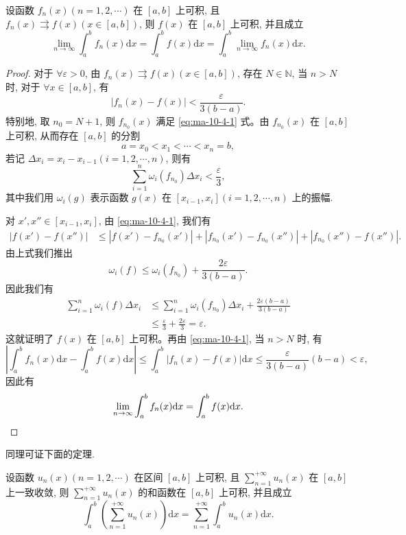 \begin{theorem}\label{theorem:ma-10-4-3}
设函数 $f_n(x)(n=1,2,\cdots)$ 在 $[a,b]$ 上可积, 且 $f_n(x)\rightrightarrows f(x)(x\in[a,b])$, 则 $f(x)$ 在 $[a,b]$ 上可积, 并且成立
\[
  \lim_{n\to\infty}\int_a^b f_n(x)\mathrm dx
  =\int_a^b f(x)\mathrm dx
  =\int_a^b\lim_{n\to\infty}f_n(x)\mathrm dx.
\]
\end{theorem}


\begin{proof}
对于 $\forall\varepsilon>0$, 由 $f_n(x)\rightrightarrows f(x)(x\in[a,b])$, 存在 $N\in\mathbb N$, 当 $n>N$ 时, 对于 $\forall x\in[a,b]$, 有
\begin{equation}
  |f_n(x)-f(x)|<\frac{\varepsilon}{3(b-a)}.
  \label{eq:ma-10-4-1}
\end{equation}
特别地, 取 $n_0=N+1$, 则 $f_{n_0}(x)$ 满足 \eqref{eq:ma-10-4-1} 式。由 $f_{n_0}(x)$ 在 $[a,b]$ 上可积, 从而存在 $[a,b]$ 的分割
\[
  a=x_0<x_1<\cdots<x_n=b,
\]
若记 $\Delta x_i=x_i-x_{i-1}(i=1,2,\cdots,n)$, 则有
\[
  \sum_{i=1}^n \omega_i(f_{n_0})\Delta x_i<\frac\varepsilon3,
\]
其中我们用 $\omega_i(g)$ 表示函数 $g(x)$ 在 $[x_{i-1},x_i](i=1,2,\cdots,n)$ 上的振幅.

对 $x',x''\in[x_{i-1},x_i]$, 由 \eqref{eq:ma-10-4-1}, 我们有
\[
\begin{aligned}
  |f(x')-f(x'')|
  &\leq |f(x')-f_{n_0}(x')|+|f_{n_0}(x')-f_{n_0}(x'')|+|f_{n_0}(x'')-f(x'')|.
\end{aligned}
\]
由上式我们推出
\[
  \omega_i(f)\leq\omega_i(f_{n_0})+\frac{2\varepsilon}{3(b-a)}.
\]
因此我们有
\[
\begin{aligned}
  \sum_{i=1}^n \omega_i(f)\Delta x_i
  &\leq \sum_{i=1}^n \omega_i(f_{n_0})\Delta x_i+\frac{2\varepsilon(b-a)}{3(b-a)}\\
  &\leq \frac\varepsilon3+\frac{2\varepsilon}{3}=\varepsilon.
\end{aligned}
\]
这就证明了 $f(x)$ 在 $[a,b]$ 上可积。再由 \eqref{eq:ma-10-4-1}, 当 $n>N$ 时, 有
\[
  \left|\int_a^b f_n(x)\mathrm dx-\int_a^b f(x)\mathrm dx\right|
  \leq \int_a^b |f_n(x)-f(x)|\mathrm dx
  \leq \frac{\varepsilon}{3(b-a)}(b-a)<\varepsilon,
\]
因此有
\[
  \lim_{n\to\infty}\int_a^b f_n(x)\mathrm dx=\int_a^b f(x)\mathrm dx.
\qedhere
\]
\end{proof}


同理可证下面的定理.

\begin{theorem}\label{theorem:ma-10-4-3-prime}
设函数 $u_n(x)(n=1,2,\cdots)$ 在区间 $[a,b]$ 上可积, 且 $\sum\limits_{n=1}^{+\infty}u_n(x)$ 在 $[a,b]$ 上一致收敛, 则 $\sum\limits_{n=1}^{+\infty}u_n(x)$ 的和函数在 $[a,b]$ 上可积, 并且成立
\begin{equation}
  \int_a^b\left(\sum_{n=1}^{+\infty}u_n(x)\right)\mathrm dx
  =\sum_{n=1}^{+\infty}\int_a^b u_n(x)\mathrm dx.
  \label{eq:ma-10-4-2}
\end{equation}
\end{theorem}

